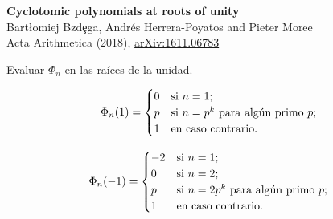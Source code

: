 \documentclass[10pt,compress]{beamer}
\begin{document}
\begin{frame}
  \begin{tcolorbox}[colback=ChetwodeBlue!10,colframe=ChetwodeBlue!60]
    \begin{center}
      \vspace*{-1mm} {
        \color{TurkishRose}\textbf{Cyclotomic polynomials at roots of unity}} \\
      Bart{\l}omiej Bzd\c{e}ga, Andr\'es Herrera-Poyatos and Pieter Moree\\
      Acta Arithmetica (2018), \href{https://arxiv.org/abs/1611.06783}{arXiv:1611.06783}
    \end{center}
    \vspace*{-6mm}
  \end{tcolorbox}

  \begin{problem}
    Evaluar $\Phi_n$ en las raíces de la unidad.
  \end{problem}

  \begin{lemma}[Evaluación en 1]
    \vspace*{-3mm}
    \[ \Phi_n(1) = \begin{cases} 0 & \hbox{si } n=1;\\
        p & \hbox{si } n=p^k \hbox{ para algún primo } p;\\
        1 & \hbox{en caso contrario.}
      \end{cases} \] \vspace*{-4mm}
  \end{lemma}
  \vspace*{-1mm}
  \begin{lemma}[Evaluación en -1]
    \vspace*{-3mm}
    \[ \Phi_n(-1) = \begin{cases} -2 & \hbox{si } n=1;\\
        0 & \hbox{si } n=2;\\
        p & \hbox{si } n=2p^k \hbox{ para algún primo } p;\\
        1 & \hbox{en caso contrario.}
      \end{cases} \] \vspace*{-4mm}
  \end{lemma}
\end{frame}
\end{document}
